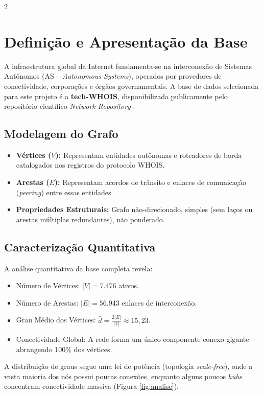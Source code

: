 \documentclass[10pt,a4paper]{article}
\begin{document}
\begin{multicols}{2}

\section{Definição e Apresentação da Base}
A infraestrutura global da Internet fundamenta-se na interconexão de Sistemas Autônomos (AS -- \textit{Autonomous Systems}), operados por provedores de conectividade, corporações e órgãos governamentais. A base de dados selecionada para este projeto é a \textbf{tech-WHOIS}, disponibilizada publicamente pelo repositório científico \textit{Network Repository} \cite{rossi2015network}.

\subsection{Modelagem do Grafo}
\begin{itemize}
    \setlength{\itemsep}{0pt}
    \item \textbf{Vértices ($V$):} Representam entidades autônomas e roteadores de borda catalogados nos registros do protocolo WHOIS.
    \item \textbf{Arestas ($E$):} Representam acordos de trânsito e enlaces de comunicação (\textit{peering}) entre essas entidades.
    \item \textbf{Propriedades Estruturais:} Grafo não-direcionado, simples (sem laços ou arestas múltiplas redundantes), não ponderado.
\end{itemize}

\subsection{Caracterização Quantitativa}
A análise quantitativa da base completa revela:
\begin{itemize}
    \setlength{\itemsep}{0pt}
    \item Número de Vértices: $|V| = 7.476$ ativos.
    \item Número de Arestas: $|E| = 56.943$ enlaces de interconexão.
    \item Grau Médio dos Vértices: $\bar{d} = \frac{2|E|}{|V|} \approx 15{,}23$.
    \item Conectividade Global: A rede forma um único componente conexo gigante abrangendo 100\% dos vértices.
\end{itemize}
A distribuição de graus segue uma lei de potência (topologia \textit{scale-free}), onde a vasta maioria dos nós possui poucas conexões, enquanto alguns poucos \textit{hubs} concentram conectividade massiva (Figura \ref{fig:analise}).


\end{multicols}
\end{document}

